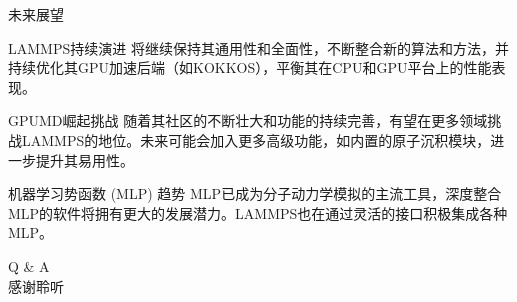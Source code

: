 \documentclass{beamer}
\begin{document}
\begin{frame}{未来展望}
    \begin{block}{LAMMPS持续演进}
        将继续保持其通用性和全面性，不断整合新的算法和方法，并持续优化其GPU加速后端（如KOKKOS），平衡其在CPU和GPU平台上的性能表现。
    \end{block}
    \begin{block}{GPUMD崛起挑战}
        随着其社区的不断壮大和功能的持续完善，有望在更多领域挑战LAMMPS的地位。未来可能会加入更多高级功能，如内置的原子沉积模块，进一步提升其易用性。
    \end{block}
    \begin{block}{机器学习势函数 (MLP) 趋势}
        MLP已成为分子动力学模拟的主流工具，深度整合MLP的软件将拥有更大的发展潜力。LAMMPS也在通过灵活的接口积极集成各种MLP。
    \end{block}
\end{frame}

\begin{frame}
    \centering
    \Huge Q \& A \\
    \vspace{1cm}
    \Large 感谢聆听
\end{frame}
\end{document}
